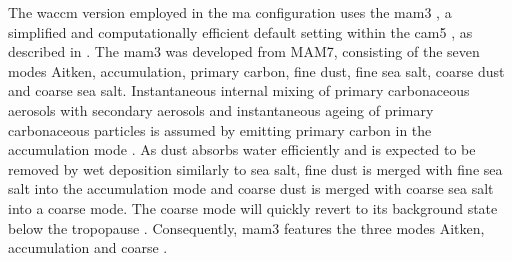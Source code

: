 \documentclass{ametsocV6.1}
\begin{document}
The \gls{waccm} version employed in the \gls{ma} configuration uses the \gls{mam3}
\citep{gettleman2019}, a simplified and computationally efficient default setting within
the \gls{cam5} \citep{liu2016}, as described in \citet{liu2012}. The \gls{mam3} was
developed from MAM7, consisting of the seven modes Aitken, accumulation, primary carbon,
fine dust, fine sea salt, coarse dust and coarse sea salt. Instantaneous internal mixing
of primary carbonaceous aerosols with secondary aerosols and instantaneous ageing of
primary carbonaceous particles is assumed by emitting primary carbon in the accumulation
mode \citep{liu2016}. As dust absorbs water efficiently and is expected to be removed by
wet deposition similarly to sea salt, fine dust is merged with fine sea salt into the
accumulation mode and coarse dust is merged with coarse sea salt into a coarse mode.
The coarse mode will quickly revert to its background state below the tropopause
\citep{liu2012}. Consequently, \gls{mam3} features the three modes Aitken, accumulation
and coarse \citep{liu2016}.
\end{document}
